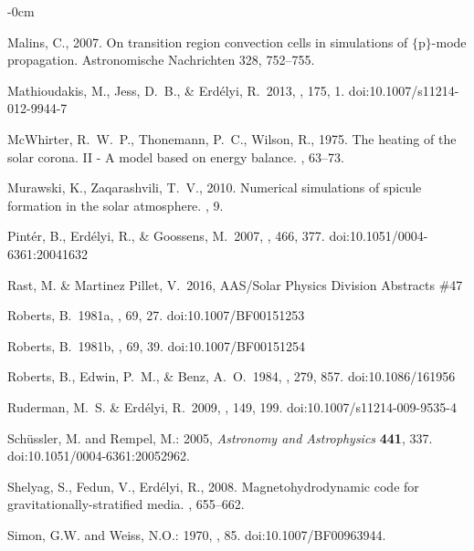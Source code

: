 \documentclass[physics,article,submit,pdftex,moreauthors]{Definitions/mdpi}
\begin{document}
\begin{adjustwidth}{-\extralength}{0cm}
\begin{thebibliography}{999}
{Malins}, C., 2007. {On transition region convection cells in simulations of
  $\{$p$\}$-mode propagation}. Astronomische Nachrichten 328, 752--755.

 Mathioudakis, M., Jess, D.~B., \& Erd{\'e}lyi, R.\ 2013, \ssr, 175, 1. doi:10.1007/s11214-012-9944-7


{McWhirter}, R.~W.~P., {Thonemann}, P.~C., {Wilson}, R., 1975. {The heating of
  the solar corona. II - A model based on energy balance}. , 63--73.

{Murawski}, K., {Zaqarashvili}, T.~V., 2010. {Numerical simulations of spicule
  formation in the solar atmosphere}. , 9.

 Pint{\'e}r, B., Erd{\'e}lyi, R., \& Goossens, M.\ 2007, \aap, 466, 377. doi:10.1051/0004-6361:20041632

 Rast, M. \& Martinez Pillet, V.\ 2016, AAS/Solar Physics Division Abstracts \#47


 Roberts, B.\ 1981a, \solphys, 69, 27. doi:10.1007/BF00151253

 Roberts, B.\ 1981b, \solphys, 69, 39. doi:10.1007/BF00151254

 Roberts, B., Edwin, P.~M., \& Benz, A.~O.\ 1984, \apj, 279, 857. doi:10.1086/161956

 Ruderman, M.~S. \& Erd{\'e}lyi, R.\ 2009, \ssr, 149, 199. doi:10.1007/s11214-009-9535-4

Sch{\"u}ssler, M. and Rempel, M.: 2005, {\it Astronomy and Astrophysics} {\bf 441}, 337. doi:10.1051/0004-6361:20052962.



{Shelyag}, S., {Fedun}, V., {Erd{\'e}lyi}, R., 2008. {Magnetohydrodynamic code
  for gravitationally-stratified media}. , 655--662.

Simon, G.W. and Weiss, N.O.: 1970, , 85. doi:10.1007/BF00963944.


\end{thebibliography}
\end{adjustwidth}
\end{document}
